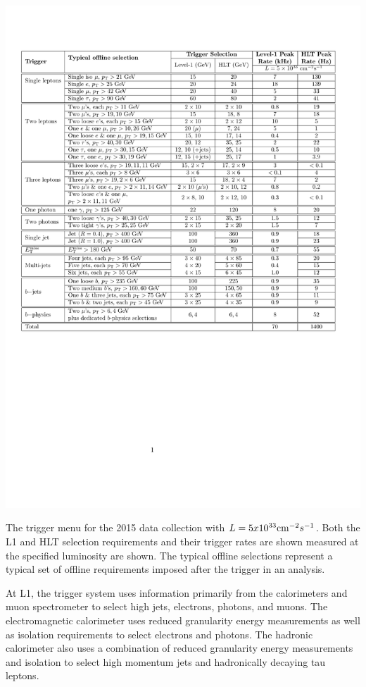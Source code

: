 \begin{table}[hbtp]
\centering
\includegraphics[width=\textwidth]{figures/trigger_menu.pdf}
\caption{The trigger menu for the 2015 data collection with $L = 5 x 10^{33}\mathrm{cm}^{-2}s^{-1}$. Both the L1 and \ac{HLT} selection requirements and their trigger rates are shown measured at the specified luminosity are shown. The typical offline selections represent a typical set of offline requirements imposed after the trigger in an analysis.}
\label{tab:trigger_menu}
\end{table}

At L1, the trigger system uses information primarily from the calorimeters and muon spectrometer to select high \pt jets, electrons, photons, and muons. 
The electromagnetic calorimeter uses reduced granularity energy measurements as well as isolation requirements to select electrons and photons.
The hadronic calorimeter also uses a combination of reduced granularity energy measurements and isolation to select high momentum jets and hadronically decaying tau leptons. 

